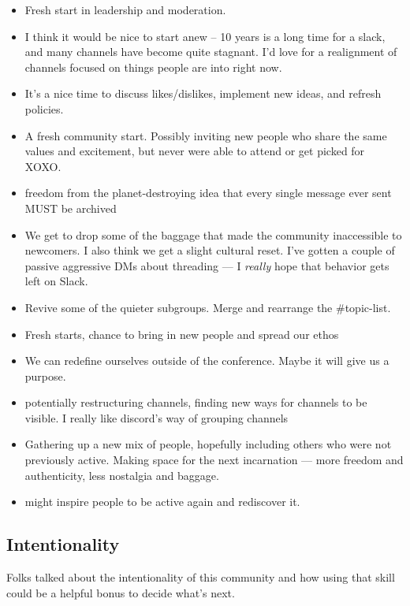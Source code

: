 \documentclass[
]{book}
\providecommand{\tightlist}{%
  \setlength{\itemsep}{0pt}\setlength{\parskip}{0pt}}
\begin{document}
\begin{itemize}
\tightlist
\item
  Fresh start in leadership and moderation.
\item
  I think it would be nice to start anew -- 10 years is a long time for a slack, and many channels have become quite stagnant. I'd love for a realignment of channels focused on things people are into right now.
\item
  It's a nice time to discuss likes/dislikes, implement new ideas, and refresh policies.
\item
  A fresh community start. Possibly inviting new people who share the same values and excitement, but never were able to attend or get picked for XOXO.
\item
  freedom from the planet-destroying idea that every single message ever sent MUST be archived
\item
  We get to drop some of the baggage that made the community inaccessible to newcomers. I also think we get a slight cultural reset. I've gotten a couple of passive aggressive DMs about threading --- I \emph{really} hope that behavior gets left on Slack.
\item
  Revive some of the quieter subgroups. Merge and rearrange the \#topic-list.
\item
  Fresh starts, chance to bring in new people and spread our ethos
\item
  We can redefine ourselves outside of the conference. Maybe it will give us a purpose.
\item
  potentially restructuring channels, finding new ways for channels to be visible. I really like discord's way of grouping channels
\item
  Gathering up a new mix of people, hopefully including others who were not previously active. Making space for the next incarnation --- more freedom and authenticity, less nostalgia and baggage.
\item
  might inspire people to be active again and rediscover it.
\end{itemize}

\subsection{Intentionality}\label{intentionality}

Folks talked about the intentionality of this community and how using that skill could be a helpful bonus to decide what's next.
\end{document}
